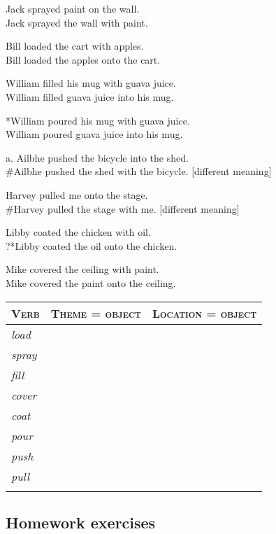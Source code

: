 \ea
\label{ex:key:1}
\ea%
Jack sprayed paint on the wall.\\
\ex Jack sprayed the wall with paint.
    \z
\z

\ea
\label{ex:key:2}
\ea%
Bill loaded the cart with apples.\\
\ex Bill loaded the apples onto the cart.
    \z
\z

\ea
\label{ex:key:3}
\ea%
William filled his mug with guava juice.\\
\ex *William filled guava juice into his mug.
    \z
\z

\ea
    \label{ex:key:4}
\ea%
 *William poured his mug with guava juice.\\
\ex  William poured guava juice into his mug.
    \z
\z

\ea
\ea%
    \label{ex:key:5}




          a. Ailbhe pushed the bicycle into the shed.\\
\ex \#Ailbhe pushed the shed with the bicycle.  [different meaning]
    \z
\z

\ea
    \label{ex:key:6}
\ea%
 Harvey pulled me onto the stage.\\
\ex \#Harvey pulled the stage with me.   [different meaning]
    \z
\z

\ea
    \label{ex:key:7}
\ea%
 Libby coated the chicken with oil.\\
\ex ?*Libby coated the oil onto the chicken.
    \z
\z

\ea
    \label{ex:key:8}
\ea%
Mike covered the ceiling with paint.\\
\ex * Mike covered the paint onto the ceiling.
    \z
\z

\noindent
\begin{tabularx}{\textwidth}{lCC}
\lsptoprule
\bfseries\scshape Verb & \bfseries\scshape Theme = object & \bfseries\scshape Location = object\\
\midrule
\itshape load &  & \\
\itshape spray &  & \\
\itshape fill &  & \\
\itshape cover &  & \\
\itshape coat &  & \\
\itshape pour &  & \\
\itshape push &  & \\
\itshape pull &  & \\
\lspbottomrule
\end{tabularx}
\subsection*{Homework exercises}
